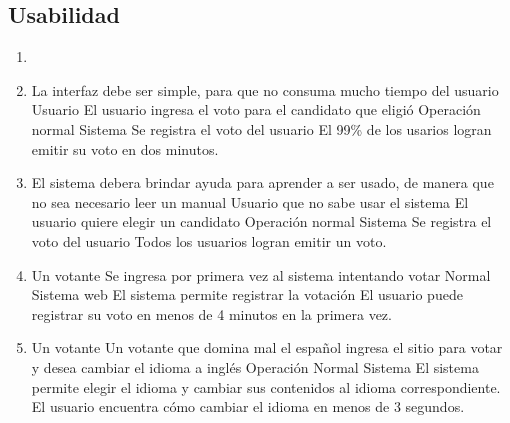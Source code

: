 \subsection{Usabilidad}

\begin{enumerate}


\item  {}

\medskip

\item  \escenario
{La interfaz debe ser simple, para que no consuma mucho tiempo del usuario}
{Usuario}
{El usuario ingresa el voto para el candidato que eligió}
{Operación normal}
{Sistema}
{Se registra el voto del usuario}
{El 99\% de los usarios logran emitir su voto en dos minutos.}
\medskip
\item  \escenario
{El sistema debera brindar ayuda para aprender a ser usado, de manera que no sea necesario leer un manual}
{Usuario que no sabe usar el sistema}
{El usuario quiere elegir un candidato}
{Operación normal}
{Sistema}
{Se registra el voto del usuario}
{Todos los usuarios logran emitir un voto.}
\medskip

\item  {}
{Un votante}
{Se ingresa por primera vez al sistema intentando votar}
{Normal}
{Sistema web}
{El sistema permite registrar la votaci\'on}
{El usuario puede registrar su voto en menos de 4 minutos en la primera vez.}

\medskip
\item   {}
{Un votante}
{Un votante que domina mal el espa\~nol ingresa el sitio para votar y desea cambiar el idioma a ingl\'es}
{Operación Normal}
{Sistema}
{El sistema permite elegir el idioma y cambiar sus contenidos al idioma correspondiente.}
{El usuario encuentra c\'omo cambiar el idioma en menos de 3 segundos.}
\medskip


\end{enumerate}
